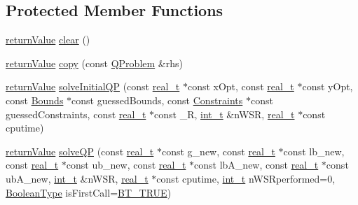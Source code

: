 \subsection*{Protected Member Functions}
\begin{DoxyCompactItemize}
\item 
\hyperlink{_message_handling_8hpp_a81d556f613bfbabd0b1f9488c0fa865e}{return\+Value} \hyperlink{class_q_problem_a9ccceb2ebb31fca9a6892b3da4286308}{clear} ()
\item 
\hyperlink{_message_handling_8hpp_a81d556f613bfbabd0b1f9488c0fa865e}{return\+Value} \hyperlink{class_q_problem_a368a4cf5e6133a1d851b720487fbb41f}{copy} (const \hyperlink{class_q_problem}{Q\+Problem} \&rhs)
\item 
\hyperlink{_message_handling_8hpp_a81d556f613bfbabd0b1f9488c0fa865e}{return\+Value} \hyperlink{class_q_problem_a787ae40ee4813935f536961a4d82486a}{solve\+Initial\+QP} (const \hyperlink{qp_o_a_s_e_s__wrapper_8h_a0d00e2b3dfadee81331bbb39068570c4}{real\+\_\+t} $\ast$const x\+Opt, const \hyperlink{qp_o_a_s_e_s__wrapper_8h_a0d00e2b3dfadee81331bbb39068570c4}{real\+\_\+t} $\ast$const y\+Opt, const \hyperlink{class_bounds}{Bounds} $\ast$const guessed\+Bounds, const \hyperlink{class_constraints}{Constraints} $\ast$const guessed\+Constraints, const \hyperlink{qp_o_a_s_e_s__wrapper_8h_a0d00e2b3dfadee81331bbb39068570c4}{real\+\_\+t} $\ast$const \+\_\+R, \hyperlink{_types_8hpp_ab6fd6105e64ed14a0c9281326f05e623}{int\+\_\+t} \&n\+W\+SR, \hyperlink{qp_o_a_s_e_s__wrapper_8h_a0d00e2b3dfadee81331bbb39068570c4}{real\+\_\+t} $\ast$const cputime)
\item 
\hyperlink{_message_handling_8hpp_a81d556f613bfbabd0b1f9488c0fa865e}{return\+Value} \hyperlink{class_q_problem_ac077c15fee28c7a9944005e0e5b17afe}{solve\+QP} (const \hyperlink{qp_o_a_s_e_s__wrapper_8h_a0d00e2b3dfadee81331bbb39068570c4}{real\+\_\+t} $\ast$const g\+\_\+new, const \hyperlink{qp_o_a_s_e_s__wrapper_8h_a0d00e2b3dfadee81331bbb39068570c4}{real\+\_\+t} $\ast$const lb\+\_\+new, const \hyperlink{qp_o_a_s_e_s__wrapper_8h_a0d00e2b3dfadee81331bbb39068570c4}{real\+\_\+t} $\ast$const ub\+\_\+new, const \hyperlink{qp_o_a_s_e_s__wrapper_8h_a0d00e2b3dfadee81331bbb39068570c4}{real\+\_\+t} $\ast$const lb\+A\+\_\+new, const \hyperlink{qp_o_a_s_e_s__wrapper_8h_a0d00e2b3dfadee81331bbb39068570c4}{real\+\_\+t} $\ast$const ub\+A\+\_\+new, \hyperlink{_types_8hpp_ab6fd6105e64ed14a0c9281326f05e623}{int\+\_\+t} \&n\+W\+SR, \hyperlink{qp_o_a_s_e_s__wrapper_8h_a0d00e2b3dfadee81331bbb39068570c4}{real\+\_\+t} $\ast$const cputime, \hyperlink{_types_8hpp_ab6fd6105e64ed14a0c9281326f05e623}{int\+\_\+t} n\+W\+S\+Rperformed=0, \hyperlink{_types_8hpp_a20f82124c82b6f5686a7fce454ef9089}{Boolean\+Type} is\+First\+Call=\hyperlink{_types_8hpp_a20f82124c82b6f5686a7fce454ef9089a34c57965bfb07125b09326a69019f9c6}{B\+T\+\_\+\+T\+R\+UE})

\end{DoxyCompactItemize}
